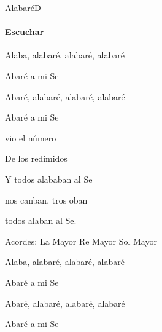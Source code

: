 \documentclass[12pt, spanish]{book}
\newcommand{\NotCCLIed}{\relax}
\begin{document}
    \begin{song}{Alabaré}{D}
        {\SBPubDom} %
        {}
        {} %
        {} %
        \ifChordBk
        \paragraph{\mbox{}\hfill\protect\href{https://open.spotify.com/intl-es/track/1H6rsjrOfqiFCMSmcojMls}{Escuchar}\mbox{}\hfill}
        \fi


        \begin{SBOpGroup}
            Alaba, alabaré, alabaré, alabaré

            Abaré a mi Se

            Abaré, alabaré, alabaré, alabaré

            Abaré a mi Se
        \end{SBOpGroup}

        \begin{SBOpGroup}
             vio el número

            De los redimidos

            Y todos alababan al Se

            nos canban, tros oban

             todos alaban al Se.
        \end{SBOpGroup}

        \ifChordBk
        \begin{SBOpGroup}
            Acordes:
            \upchord{\A}\qquad La Mayor \hfill
            \upchord{\D}\qquad Re Mayor \hfill\null\break
            \upchord{\G}\qquad Sol Mayor \hfill
        \end{SBOpGroup}
        \fi
        \begin{SBExtraKeys}{

            \begin{SBOpGroup}
                Alaba, alabaré, alabaré, alabaré

                Abaré a mi Se

                Abaré, alabaré, alabaré, alabaré

                Abaré a mi Se
            \end{SBOpGroup}

}
\end{SBExtraKeys}
\end{song}
\end{document}
